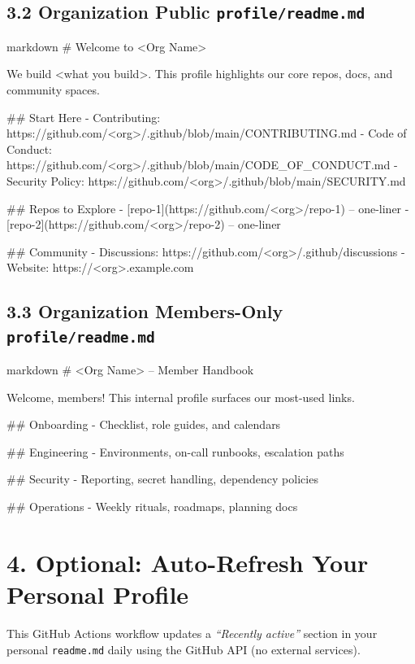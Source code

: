 \documentclass[11pt]{article}
\renewcommand{\kbd}[1]{\texttt{#1}}
\begin{document}
\subsection*{3.2 Organization Public \texttt{profile/readme.md}}
\begin{code}{markdown}
# Welcome to <Org Name>

We build <what you build>. This profile highlights our core repos, docs, and community spaces.

## Start Here
- Contributing: https://github.com/<org>/.github/blob/main/CONTRIBUTING.md
- Code of Conduct: https://github.com/<org>/.github/blob/main/CODE_OF_CONDUCT.md
- Security Policy: https://github.com/<org>/.github/blob/main/SECURITY.md

## Repos to Explore
- [repo-1](https://github.com/<org>/repo-1) -- one-liner
- [repo-2](https://github.com/<org>/repo-2) -- one-liner

## Community
- Discussions: https://github.com/<org>/.github/discussions
- Website: https://<org>.example.com
\end{code}

\subsection*{3.3 Organization Members-Only \texttt{profile/readme.md}}
\begin{code}{markdown}
# <Org Name> -- Member Handbook

Welcome, members! This internal profile surfaces our most-used links.

## Onboarding
- Checklist, role guides, and calendars

## Engineering
- Environments, on-call runbooks, escalation paths

## Security
- Reporting, secret handling, dependency policies

## Operations
- Weekly rituals, roadmaps, planning docs
\end{code}

\section*{4. Optional: Auto-Refresh Your Personal Profile}

\noindent
This GitHub Actions workflow updates a \emph{``Recently active''} section in your personal \kbd{readme.md} daily using the GitHub API (no external services).
\end{document}
